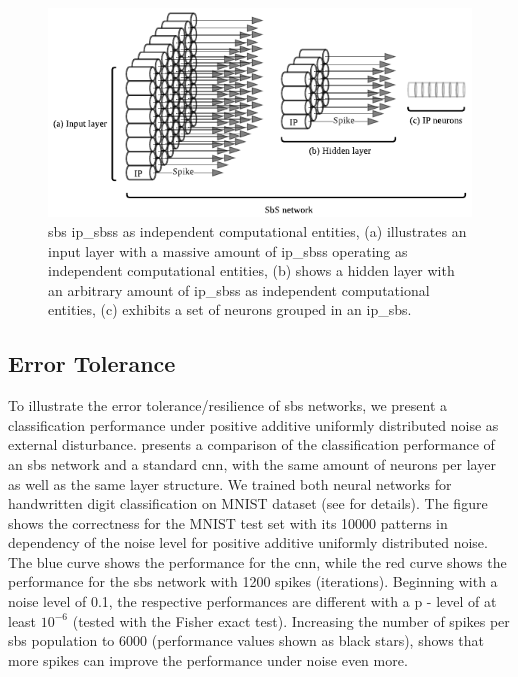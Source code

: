 \begin{figure}[b!]
	\centering
	\includegraphics[width=0.5\columnwidth]{./chapters/sbs_accelerator/figures/SbS_layer.pdf}
	\caption{\gls{sbs} \gls{ip_sbs}s as independent computational entities, (a) illustrates an input layer with a massive amount of \glspl{ip_sbs} operating as independent computational entities, (b) shows a hidden layer with an arbitrary amount of \gls{ip_sbs}s as independent computational entities, (c) exhibits a set of neurons grouped in an \gls{ip_sbs}.}
	\label{fig:SbS_layer}
\end{figure}


\subsection{Error Tolerance}

To illustrate the error tolerance/resilience of \gls{sbs} networks, we present a classification performance under positive additive uniformly distributed noise as external disturbance.  presents a comparison of the classification performance of an \gls{sbs} network and a standard \gls{cnn}, with the same amount of
neurons per layer as well as the same layer structure. We trained both neural networks for handwritten digit classification on MNIST dataset \cite{lecun1998mnist} (see \cite{rotermund2019Backpropagation} for details). The figure shows the correctness for the MNIST test set with its \num[group-separator={,}]{10000} patterns in dependency of the noise level for positive additive
uniformly distributed noise. The blue curve shows the performance for
the \gls{cnn}, while the red curve shows the performance for
the \gls{sbs} network with \num[group-separator={,}]{1200} spikes (iterations). Beginning
with a noise level of 0.1, the respective performances are different
with a p - level of at least $10^{-6}$ (tested with the Fisher exact
test). Increasing the number of spikes per \gls{sbs} population to \num[group-separator={,}]{6000}
(performance values shown as black stars), shows that more spikes can
improve the performance under noise even more.


